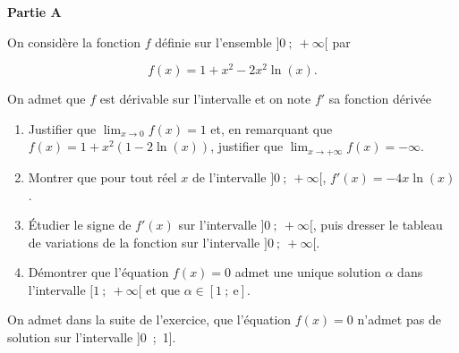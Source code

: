 \medskip

\textbf{Partie A}

\medskip

On considère la fonction $f$ définie sur l'ensemble $]0~;~+ \infty[$ par

\[f(x) = 1 + x^2 - 2x^2\ln (x).\]

On admet que $f$ est dérivable sur l'intervalle et on note $f'$ sa fonction dérivée

\medskip

\begin{enumerate}
\item Justifier que $\displaystyle\lim_{x \to 0} f(x) = 1$ et, en remarquant que $f(x) = 1 + x^2(1 - 2\ln (x))$, justifier que $\displaystyle\lim_{x \to + \infty} f(x) = - \infty$.
\item Montrer que pour tout réel $x$  de l'intervalle $]0~;~+ \infty[$, \: $f'(x) = - 4x\ln (x)$.
\item Étudier le signe de $f'(x)$ sur l'intervalle $]0~;~+ \infty[$, puis dresser le tableau de variations de la fonction sur l'intervalle $]0~;~+ \infty[$.
\item Démontrer que l'équation $f(x) = 0$ admet une unique solution $\alpha$ dans l'intervalle $[1~;~+ \infty[$ et que $\alpha \in [1~;~\text{e}]$.
\end{enumerate}

On admet dans la suite de l'exercice, que l'équation $f(x) = 0$ n'admet pas de solution sur l'intervalle ]0~;~1].

